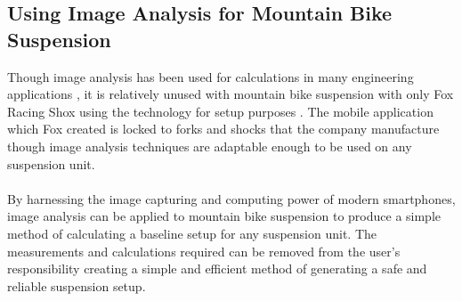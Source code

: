 \subsection{Using Image Analysis for Mountain Bike Suspension}
Though image analysis has been used for calculations in many engineering applications \citep{concreteanalysis, bridgecables}, it is relatively unused with mountain bike suspension with only Fox Racing Shox using the technology for setup purposes \citep{foxird}. The mobile application which Fox created is locked to \glspl{fork} and \glspl{shock} that the company manufacture though image analysis techniques are adaptable enough to be used on any suspension unit.
\\\\
By harnessing the image capturing and computing power of modern smartphones, image analysis can be applied to mountain bike suspension to produce a simple method of calculating a baseline setup for any suspension unit. The measurements and calculations required can be removed from the user's responsibility creating a simple and efficient method of generating a safe and reliable suspension setup.